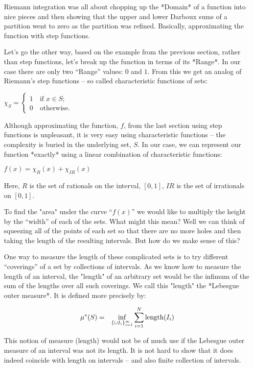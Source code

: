 \documentclass{article}
\begin{document}
Riemann integration was all about chopping up the *Domain* of a function into nice 
pieces and then showing that the upper and lower Darboux sums of a partition 
went to zero as the partition was refined. Basically, approximating the function 
with step functions.

Let's go the other way, based on the example from the previous section, rather 
than step functions, let's break up the function in terms of its *Range*. 
In our case there are only two ``Range'' values: $0$ and $1$. From this we get an 
analog of Riemann's step functions -- 
so called characteristic functions of sets:

$\chi_{S} = \begin{cases} 1 \quad \text{if $x \in  S$;} \\ 0 \quad \text{otherwise.} \end{cases}$

Although approximating the function, $f$, from the last section using step 
functions is unpleasant, it is very easy using characteristic functions -- the complexity 
is buried in the underlying set, $S$. In our case, we can represent our function *exactly*
using a linear combination of characteristic functions:

$f(x) = \chi_{R}(x) + \chi_{IR}(x)$

Here, $R$ is the set of rationals on the interval, $[0,1]$, $IR$ is the set 
of irrationals on $[0, 1]$.

To find the "area" under the curve ``$f(x)$'' we would like to multiply the 
height by the ``width'' of each of the sets. What might this mean?
Well we can think of squeezing all of the points of each set so that there are 
no more holes and then taking the length of the resulting intervals.
But how do we make sense of this?

One way to measure the length of these complicated sets is to try different ``coverings'' 
of a set by collections of intervals.
As we know how to measure the length of an interval, the "length" of an arbitrary set 
would be the infimum of the sum of the lengths over all such coverings.
We call this "length" the *Lebesgue outer measure*. It is defined more precisely by:

\begin{eqnarray}
	\mu^*(S) & = & \inf_{\{\cup {I_i}\}_{i=1}^\infty} \sum_{i=1}^N {\rm length}(I_i)
\end{eqnarray}

This notion of measure (length) would not be of much use if the Lebesgue outer measure of
an interval was not its length.
It is not hard to show that it does indeed coincide with length on 
intervals -- and also finite collection of intervals.
\end{document}
